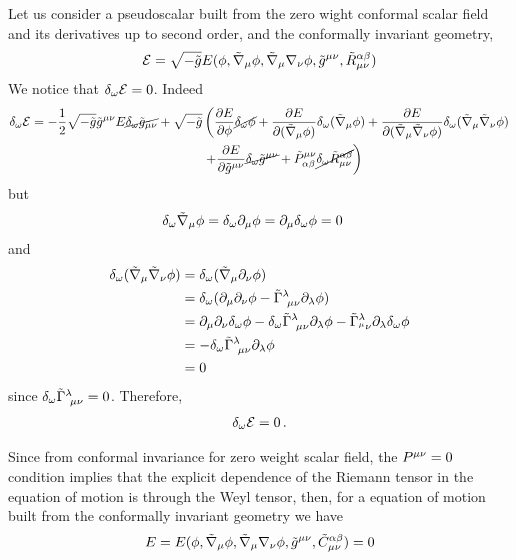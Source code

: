Let us consider a pseudoscalar built from the zero wight conformal scalar field and its derivatives up to second order, and the conformally invariant geometry,
\begin{equation}
  \mathcal{E}=\sqrt{-\tilde{g}}E(\phi,\tilde{\nabla}_\mu\phi ,\tilde{\nabla}_\mu\nabla_\nu \phi ,\tilde{g}^{\mu\nu },\tilde{R}_{\mu\nu }^{\alpha\beta })
\end{equation}
We notice that $\delta_\omega\mathcal{E}=0$. Indeed
\begin{align*}
  \delta_\omega\mathcal{E}=-\frac{1}{2}\sqrt{-\tilde{g}}\tilde{g}^{\mu\nu }E\cancel{\delta_\omega\tilde{g}_{\mu\nu }}+\sqrt{-\tilde{g}}&\left(\pdv{E}{\phi}\cancel{\delta_\omega\phi} +\pdv{E}{(\tilde{\nabla}_\mu\phi)}\delta_\omega (\tilde{\nabla}_\mu\phi )+\pdv{E}{(\tilde{\nabla}_\mu\tilde{\nabla}_\nu\phi)}\delta_\omega(\tilde{\nabla}_\mu\tilde{\nabla}_\nu\phi )\right.\\&\left. +\pdv{E}{\tilde{g}^{\mu\nu}}\cancel{\delta_\omega\tilde{g}^{\mu\nu }}+\tilde{P}^{\mu\nu }_{\alpha\beta}\cancel{\delta_\omega\tilde{R}^{\alpha\beta }_{\mu\nu }}\right)
\end{align*}
but
\begin{align}
  \delta_\omega\tilde{\nabla}_\mu\phi&=\delta_\omega\partial_\mu\phi =\partial_\mu\delta_\omega\phi=0
\end{align}
and
\begin{align}
  \delta_\omega(\tilde{\nabla}_\mu\tilde{\nabla}_\nu\phi )&=\delta_\omega(\tilde{\nabla}_\mu\partial_\nu \phi )\\
 &=\delta_\omega(\partial_\mu\partial_\nu \phi -\tilde{\Gamma}^{\lambda}_{~\mu\nu }\partial_\lambda\phi )\\
 &=\partial_\mu\partial_\nu \delta_\omega\phi -\delta_\omega\tilde{\Gamma}^\lambda_{~\mu\nu }\partial_\lambda\phi -\tilde{\Gamma}^\lambda_{^\mu\nu }\partial_\lambda \delta_\omega\phi \\
 &=-\delta_\omega\tilde{\Gamma}^\lambda_{~\mu\nu }\partial_\lambda\phi\\
 &=0
\end{align}
since $\delta_\omega\tilde{\Gamma}^\lambda_{~\mu\nu }=0$. Therefore,
\begin{align}
  \delta_\omega\mathcal{E}=0\, .
\end{align}


Since from conformal invariance for zero weight scalar field, the $P^{\mu\nu }=0$ condition implies that the explicit dependence of the Riemann tensor in the equation of motion is through the Weyl tensor, then,  for a equation of motion built from the conformally invariant geometry we have
\begin{equation}\label{EE}
  E=E(\phi,\tilde{\nabla}_\mu\phi ,\tilde{\nabla}_\mu\nabla_\nu \phi ,\tilde{g}^{\mu\nu },\tilde{C}_{\mu\nu }^{\alpha\beta })=0
\end{equation}



